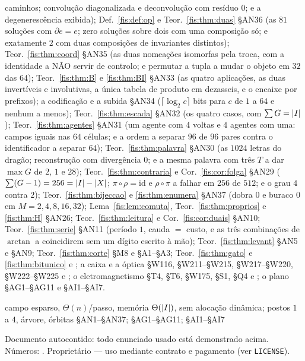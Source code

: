 \documentclass[livro.tex]{subfiles}
\begin{document}
{caminhos; convolução diagonalizada e deconvolução com resíduo $0$; e a
degenerescência exibida);
Def.~\ref{fis:def:op} e Teor.~\ref{fis:thm:duas} §AN36 (as $81$ soluções com
$\partial e=e$; zero soluções sobre dois com uma composição só; e exatamente $2$
com duas composições de invariantes distintos);
Teor.~\ref{fis:thm:coord} §AN35 (as duas nomeações isomorfas pela troca, com a
identidade a NÃO servir de controlo; e permutar a tupla a mudar o objeto em $32$
das $64$);
Teor.~\ref{fis:thm:B} e \ref{fis:thm:BI} §AN33 (as quatro aplicações, as duas
invertíveis e involutivas, a única tabela de produto em dezasseis, e o encaixe por
prefixos);
a codificação e a subida §AN34 ($\lceil\log_2 c\rceil$ bits para $c$ de $1$ a $64$
e nenhum a menos);
Teor.~\ref{fis:thm:escada} §AN32 (os quatro casos, com $\sum G=\lvert I\rvert$);
Teor.~\ref{fis:thm:agentes} §AN31 (um agente com $4$ voltas e $4$ agentes com uma:
campos iguais nas $64$ células; e a ordem a separar $96$ de $96$ pares contra o
identificador a separar $64$);
Teor.~\ref{fis:thm:palavra} §AN30 (as $1024$ letras do dragão; reconstrução com
divergência $0$; e a mesma palavra com três $T$ a dar $\max G$ de $2$, $1$ e $28$);
Teor.~\ref{fis:thm:contraria} e Cor.~\ref{fis:cor:folga} §AN29
($\sum(G-1)=256=\lvert I\rvert-\lvert X\rvert$; $\pi\circ\rho=\mathrm{id}$ e $\rho\circ\pi$ a
falhar em $256$ de $512$; e o grau $4$ contra $2$);
Teor.~\ref{fis:thm:bijeccao} e \ref{fis:thm:enumera} §AN37 (dobra $0$ e buraco $0$
em $M=2,4,8,16,32$);
Lema~\ref{fis:lem:comuta}, Teor.~\ref{fis:thm:proprios} e \ref{fis:thm:H} §AN26;
Teor.~\ref{fis:thm:leitura} e Cor.~\ref{fis:cor:duais} §AN10;
Teor.~\ref{fis:thm:serie} §AN11 (período $1$, cauda $=$ custo, e as três
combinações de $\arctan$ a coincidirem sem um dígito escrito à mão);
Teor.~\ref{fis:thm:levant} §AN5 e §AN9;
Teor.~\ref{fis:thm:corte}  §M8 e 
§A1--§A3;
Teor.~\ref{fis:thm:gato} e \ref{fis:thm:bitunico}  e
;
a caixa e a óptica  §W116, §W211--§W215, §W217--§W220,
§W222--§W225 e ;
o eletromagnetismo  §T4, §T6,  §W175,
 §S1,  §Q4 e
;
o plano  §AG1--§AG11 e 
§AI1--§AI7.}

        {campo esparso, $\Theta(n)$/passo, memória $\Theta(\lvert I\rvert)$, sem alocação dinâmica; postos $1$ a $4$, árvore, órbitas}
        { §AN1--§AN37;  §AG1--§AG11;  §AI1--§AI7}

\vfill
{\footnotesize\color{cinza}\noindent
Documento autocontido: todo enunciado usado está demonstrado acima.
Números: .
Proprietário --- uso mediante contrato e pagamento (ver \texttt{LICENSE}).\par}
\end{document}
